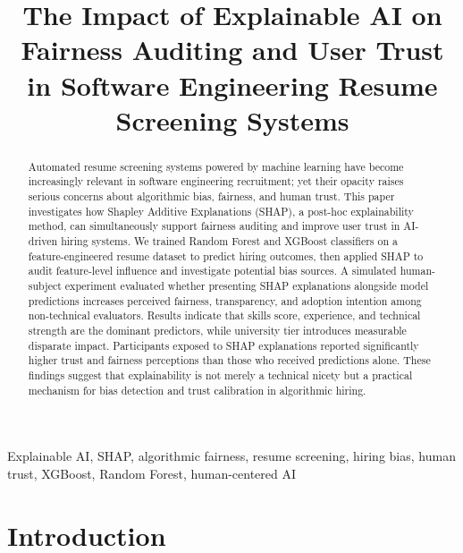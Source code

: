 \documentclass[conference]{IEEEtran}
\begin{document}
\title{The Impact of Explainable AI on Fairness Auditing and User Trust in Software Engineering Resume Screening Systems}

\author{
}

\maketitle

\begin{abstract}
Automated resume screening systems powered by machine learning have become increasingly relevant in software engineering recruitment; yet their opacity raises serious concerns about algorithmic bias, fairness, and human trust. This paper investigates how Shapley Additive Explanations (SHAP), a post-hoc explainability method, can simultaneously support fairness auditing and improve user trust in AI-driven hiring systems. We trained Random Forest and XGBoost classifiers on a feature-engineered resume dataset to predict hiring outcomes, then applied SHAP to audit feature-level influence and investigate potential bias sources. A simulated human-subject experiment evaluated whether presenting SHAP explanations alongside model predictions increases perceived fairness, transparency, and adoption intention among non-technical evaluators. Results indicate that skills score, experience, and technical strength are the dominant predictors, while university tier introduces measurable disparate impact. Participants exposed to SHAP explanations reported significantly higher trust and fairness perceptions than those who received predictions alone. These findings suggest that explainability is not merely a technical nicety but a practical mechanism for bias detection and trust calibration in algorithmic hiring.
\end{abstract}

\begin{IEEEkeywords}
Explainable AI, SHAP, algorithmic fairness, resume screening, hiring bias, human trust, XGBoost, Random Forest, human-centered AI
\end{IEEEkeywords}

\section{Introduction}
\end{document}
